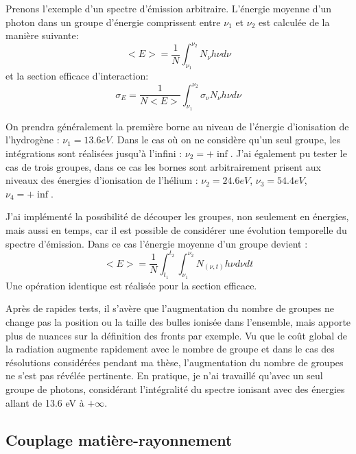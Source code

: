 Prenons l'exemple d'un spectre d'émission arbitraire.
L’énergie moyenne d'un photon dans un groupe d'énergie comprissent entre $\nu_1$ et $\nu_2$ est calculée de la manière suivante:
\begin{equation}
<E> = \frac{1}{N} \int_{\nu_1}^{\nu_2} N_\nu h \nu d\nu
\end{equation}
et la section efficace d'interaction:
\begin{equation}
\sigma_E = \frac{1}{N<E>} \int_{\nu_1}^{\nu_2} \sigma_\nu N_\nu h \nu d\nu
\end{equation}

On prendra généralement la première borne au niveau de l'énergie d'ionisation de l'hydrogène : $\nu_1=13.6eV$.
Dans le cas où on ne considère qu'un seul groupe, les intégrations sont réalisées jusqu'à l'infini : $\nu_2= + \inf$.
J'ai également pu tester le cas de trois groupes, dans ce cas les bornes sont arbitrairement prisent aux niveaux des énergies d'ionisation de l'hélium : 
$\nu_2= 24.6 eV$, $\nu_3= 54.4 eV $, $\nu_4= + \inf$.

J'ai implémenté la possibilité de découper les groupes, non seulement en énergies, mais aussi en temps, car il est possible de considérer une évolution temporelle du spectre d'émission.
Dans ce cas l'énergie moyenne d'un groupe devient : 
\begin{equation}
<E> = \frac{1}{N}  \int_{t_1}^{t_2}  \int_{\nu_1}^{\nu_2} N_{(\nu,t)} h \nu d\nu dt
\end{equation}
Une opération identique est réalisée pour la section efficace.

Après de rapides tests, il s'avère que l'augmentation du nombre de groupes ne change pas la position ou la taille des bulles ionisée dans l'ensemble, mais apporte plus de nuances sur la définition des fronts par exemple.
Vu que le coût global de la radiation augmente rapidement avec le nombre de groupe et dans le cas des résolutions considérées pendant ma thèse, l'augmentation du nombre de groupes ne s'est pas révélée pertinente.
En pratique, je n'ai travaillé qu'avec un seul groupe de photons, considérant l'intégralité du spectre ionisant avec des énergies allant de 13.6 eV à $+\infty$.

\subsection{Couplage matière-rayonnement}
\label{sec:chimie}

